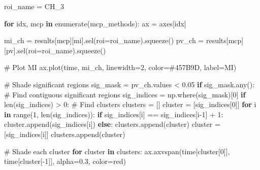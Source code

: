 \documentclass[
  11pt,
  letterpaper,
  oneside,
  openany]{book}
\newenvironment{Shaded}{\begin{snugshade}}{\end{snugshade}}
\newcommand{\BuiltInTok}[1]{\textcolor[rgb]{0.00,0.23,0.31}{#1}}
\newcommand{\CommentTok}[1]{\textcolor[rgb]{0.37,0.37,0.37}{#1}}
\newcommand{\ControlFlowTok}[1]{\textcolor[rgb]{0.00,0.23,0.31}{\textbf{#1}}}
\newcommand{\DecValTok}[1]{\textcolor[rgb]{0.68,0.00,0.00}{#1}}
\newcommand{\FloatTok}[1]{\textcolor[rgb]{0.68,0.00,0.00}{#1}}
\newcommand{\KeywordTok}[1]{\textcolor[rgb]{0.00,0.23,0.31}{\textbf{#1}}}
\newcommand{\NormalTok}[1]{\textcolor[rgb]{0.00,0.23,0.31}{#1}}
\newcommand{\OperatorTok}[1]{\textcolor[rgb]{0.37,0.37,0.37}{#1}}
\newcommand{\StringTok}[1]{\textcolor[rgb]{0.13,0.47,0.30}{#1}}
\begin{document}
\begin{Shaded}
\begin{Highlighting}[]
\NormalTok{roi\_name }\OperatorTok{=} \StringTok{\textquotesingle{}CH\_3\textquotesingle{}}

\ControlFlowTok{for}\NormalTok{ idx, mcp }\KeywordTok{in} \BuiltInTok{enumerate}\NormalTok{(mcp\_methods):}
\NormalTok{    ax }\OperatorTok{=}\NormalTok{ axes[idx]}
    
\NormalTok{    mi\_ch }\OperatorTok{=}\NormalTok{ results[mcp][}\StringTok{\textquotesingle{}mi\textquotesingle{}}\NormalTok{].sel(roi}\OperatorTok{=}\NormalTok{roi\_name).squeeze()}
\NormalTok{    pv\_ch }\OperatorTok{=}\NormalTok{ results[mcp][}\StringTok{\textquotesingle{}pv\textquotesingle{}}\NormalTok{].sel(roi}\OperatorTok{=}\NormalTok{roi\_name).squeeze()}
    
    \CommentTok{\# Plot MI}
\NormalTok{    ax.plot(time, mi\_ch, linewidth}\OperatorTok{=}\DecValTok{2}\NormalTok{, color}\OperatorTok{=}\StringTok{\textquotesingle{}\#457B9D\textquotesingle{}}\NormalTok{, label}\OperatorTok{=}\StringTok{\textquotesingle{}MI\textquotesingle{}}\NormalTok{)}
    
    \CommentTok{\# Shade significant regions}
\NormalTok{    sig\_mask }\OperatorTok{=}\NormalTok{ pv\_ch.values }\OperatorTok{\textless{}} \FloatTok{0.05}
    \ControlFlowTok{if}\NormalTok{ sig\_mask.}\BuiltInTok{any}\NormalTok{():}
        \CommentTok{\# Find contiguous significant regions}
\NormalTok{        sig\_indices }\OperatorTok{=}\NormalTok{ np.where(sig\_mask)[}\DecValTok{0}\NormalTok{]}
        \ControlFlowTok{if} \BuiltInTok{len}\NormalTok{(sig\_indices) }\OperatorTok{\textgreater{}} \DecValTok{0}\NormalTok{:}
            \CommentTok{\# Find clusters}
\NormalTok{            clusters }\OperatorTok{=}\NormalTok{ []}
\NormalTok{            cluster }\OperatorTok{=}\NormalTok{ [sig\_indices[}\DecValTok{0}\NormalTok{]]}
            \ControlFlowTok{for}\NormalTok{ i }\KeywordTok{in} \BuiltInTok{range}\NormalTok{(}\DecValTok{1}\NormalTok{, }\BuiltInTok{len}\NormalTok{(sig\_indices)):}
                \ControlFlowTok{if}\NormalTok{ sig\_indices[i] }\OperatorTok{==}\NormalTok{ sig\_indices[i}\OperatorTok{{-}}\DecValTok{1}\NormalTok{] }\OperatorTok{+} \DecValTok{1}\NormalTok{:}
\NormalTok{                    cluster.append(sig\_indices[i])}
                \ControlFlowTok{else}\NormalTok{:}
\NormalTok{                    clusters.append(cluster)}
\NormalTok{                    cluster }\OperatorTok{=}\NormalTok{ [sig\_indices[i]]}
\NormalTok{            clusters.append(cluster)}
            
            \CommentTok{\# Shade each cluster}
            \ControlFlowTok{for}\NormalTok{ cluster }\KeywordTok{in}\NormalTok{ clusters:}
\NormalTok{                ax.axvspan(time[cluster[}\DecValTok{0}\NormalTok{]], time[cluster[}\OperatorTok{{-}}\DecValTok{1}\NormalTok{]], }
\NormalTok{                          alpha}\OperatorTok{=}\FloatTok{0.3}\NormalTok{, color}\OperatorTok{=}\StringTok{\textquotesingle{}red\textquotesingle{}}\NormalTok{)}
    

\end{Highlighting}
\end{Shaded}
\end{document}
